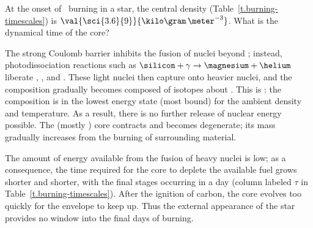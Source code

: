 \begin{exercisebox}
At the onset of \oxygen\ burning in a  star, the central density (Table~\ref{t.burning-timescales}) is $\val{\sci{3.6}{9}}{\kilo\gram\,\meter^{-3}}$.  What is the dynamical time of the core?
\end{exercisebox}

The strong Coulomb barrier inhibits the fusion of nuclei beyond \oxygen; instead, photodissociation reactions such as $\silicon+\gamma \to \magnesium+\helium$ liberate \nt, \pt, and \helium.  These light nuclei then capture onto heavier nuclei, and the composition gradually becomes composed of isotopes about \iron.  This is : the composition is in the lowest energy state (most bound) for the ambient density and temperature. As a result, there is no further release of nuclear energy possible. The (mostly \iron) core contracts and becomes degenerate; its mass gradually increases from the burning of surrounding material.

The amount of energy available from the fusion of heavy nuclei is low; as a consequence, the time required for the core to deplete the available fuel grows shorter and shorter, with the final stages occurring in a day (column labeled $\tau$ in Table~\ref{t.burning-timescales}). After the ignition of carbon, the core evolves too quickly for the envelope to keep up. Thus the external appearance of the star provides no window into the final days of burning.

